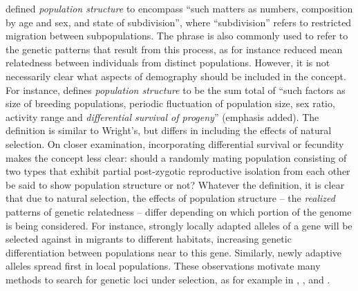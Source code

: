\documentclass[11pt, oneside]{article}   	%
\newif\ifsubmission
\newcommand\citet{\cite}
\newcommand{\citetx}[2][]{\ifsubmission#1 \cite{#2}\else\citet{#2}\fi}
\renewcommand{\revpoint}[2]{\relax}
\begin{document}

\citetx[Wright]{wright1949genetical} defined \emph{population structure} to encompass ``such matters as numbers, composition by age and sex, and state of subdivision'',
where ``subdivision'' refers to restricted migration between subpopulations.
The phrase is also commonly used to refer to the genetic patterns that result from this process,
as for instance reduced mean relatedness between individuals from distinct populations.
However, it is not necessarily clear what aspects of demography should be included in the concept. %
For instance, 
\citetx[Blair]{blair1943population} defines \emph{population structure} to be the sum total of
``such factors as size of breeding populations, periodic fluctuation of population size, sex ratio, activity range and \emph{differential survival of progeny}'' (emphasis added).
The definition is similar to Wright's, but differs in including the effects of natural selection.
On closer examination, incorporating differential survival or fecundity makes the concept less clear:
should a randomly mating population consisting of two types 
that exhibit partial post-zygotic reproductive isolation from each other \revpoint{AE}{2}
be said to show population structure or not?
Whatever the definition,
it is clear that due to natural selection, the effects of population structure --
the \emph{realized} patterns of genetic relatedness --
differ depending on which portion of the genome is being considered.
For instance, strongly locally adapted alleles of a gene will be selected against in migrants to different habitats,
increasing genetic differentiation between populations near to this gene.
Similarly, newly adaptive alleles spread first in local populations.
These observations motivate many methods to search for genetic loci under selection,
as for example in \citet{huertasnchez2013genetic}, \citet{martin2016natural}, 
and \citet{duforetfrebourg2015detecting}.
\end{document}
